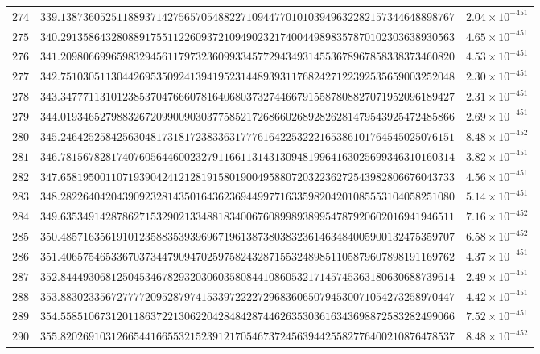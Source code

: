 \documentclass[12pt,reqno]{amsart}
\theoremstyle{remark}
\begin{document}
\begin{longtable}{clc}
$274$ & $339.1387360525118893714275657054882271094477010103949632282157344648898767$ & $2.04\times 10^{-451}$ \\
$275$ & $340.2913586432808891755112260937210949023217400449898357870102303638930563$ & $4.65\times 10^{-451}$ \\
$276$ & $341.2098066996598329456117973236099334577294349314553678967858338373460820$ & $4.53\times 10^{-451}$ \\
$277$ & $342.7510305113044269535092413941952314489393117682427122392535659003252048$ & $2.30\times 10^{-451}$ \\
$278$ & $343.3477711310123853704766607816406803732744667915587808827071952096189427$ & $2.31\times 10^{-451}$ \\
$279$ & $344.0193465279883267209900903037758521726866026892826281479543925472485866$ & $2.69\times 10^{-451}$ \\
$280$ & $345.2464252584256304817318172383363177761642253222165386101764545025076151$ & $8.48\times 10^{-452}$ \\
$281$ & $346.7815678281740760564460023279116611314313094819964163025699346310160314$ & $3.82\times 10^{-451}$ \\
$282$ & $347.6581950011071939042412128191580190049588072032236272543982806676043733$ & $4.56\times 10^{-451}$ \\
$283$ & $348.2822640420439092328143501643623694499771633598204201085553104058251080$ & $5.14\times 10^{-451}$ \\
$284$ & $349.6353491428786271532902133488183400676089989389954787920602016941946511$ & $7.16\times 10^{-452}$ \\
$285$ & $350.4857163561910123588353939696719613873803832361463484005900132475359707$ & $6.58\times 10^{-452}$ \\
$286$ & $351.4065754653367037344790947025975824328715532489851105879607898191169762$ & $4.37\times 10^{-451}$ \\
$287$ & $352.8444930681250453467829320306035808441086053217145745363180630688739614$ & $2.49\times 10^{-451}$ \\
$288$ & $353.8830233567277772095287974153397222272968360650794530071054273258970447$ & $4.42\times 10^{-451}$ \\
$289$ & $354.5585106731201186372213062204284842874462635303616343698872583282499066$ & $7.52\times 10^{-451}$ \\
$290$ & $355.8202691031266544166553215239121705467372456394425582776400210876478537$ & $8.48\times 10^{-452}$ \\

\end{longtable}
\end{document}
